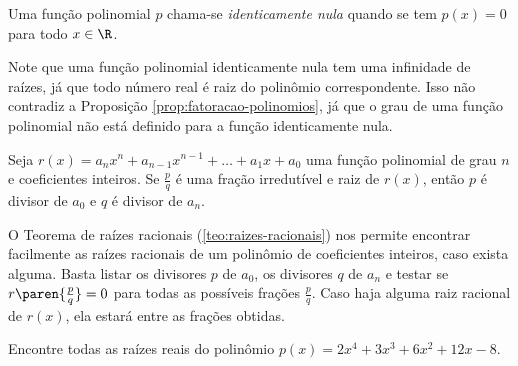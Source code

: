 \begin{definition}
Uma função polinomial $p$ chama-se \emph{identicamente nula} quando
se tem $p(x) = 0$ para todo $x \in \R$.
\end{definition}

\begin{remark}
Note que uma função polinomial identicamente nula tem uma infinidade de raízes, 
já que todo número real é raiz do polinômio correspondente. 
Isso não contradiz a Proposição \ref{prop:fatoracao-polinomios}, 
já que o grau de uma função polinomial não está definido para a função identicamente nula.
\end{remark}

\begin{theorem} 
\label{teo:raizes-racionais}
    Seja $r(x) = a_n x^n + a_{n-1} x^{n-1} + \dots + a_1 x + a_0$ uma função polinomial de grau $n$ e coeficientes inteiros. Se $\frac p q$ é uma fração irredutível e raiz de $r (x)$, então $p$ é divisor de $a_0$ e $q$ é divisor de $a_n$.
\end{theorem}

O Teorema de raízes racionais (\ref{teo:raizes-racionais}) nos permite encontrar facilmente as raízes racionais de um polinômio de coeficientes inteiros, caso exista alguma. Basta listar os divisores $p$ de $a_0$, os divisores $q$ de $a_n$ e testar se $r \paren {\frac p q} = 0$ para todas as possíveis frações $\frac p q$. Caso haja alguma raiz racional de $r(x)$, ela estará entre as frações obtidas.

\begin{example}
    Encontre todas as raízes reais do polinômio $p(x) = 2x^4 + 3x^3 + 6x^2 + 12x -8$.
\end{example}

